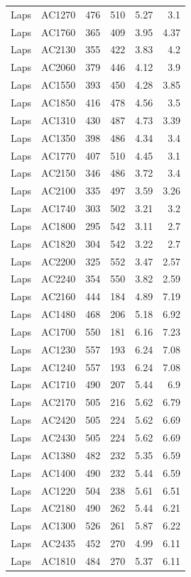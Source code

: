 \documentclass[article,10pt,microtype]{article}
\begin{document}
\begin{longtable}{llrrrr}
Laps & AC1270 & 476 & 510 & 5.27 & 3.1\\
Laps & AC1760 & 365 & 409 & 3.95 & 4.37\\
Laps & AC2130 & 355 & 422 & 3.83 & 4.2\\
Laps & AC2060 & 379 & 446 & 4.12 & 3.9\\
Laps & AC1550 & 393 & 450 & 4.28 & 3.85\\
Laps & AC1850 & 416 & 478 & 4.56 & 3.5\\
Laps & AC1310 & 430 & 487 & 4.73 & 3.39\\
Laps & AC1350 & 398 & 486 & 4.34 & 3.4\\
Laps & AC1770 & 407 & 510 & 4.45 & 3.1\\
Laps & AC2150 & 346 & 486 & 3.72 & 3.4\\
Laps & AC2100 & 335 & 497 & 3.59 & 3.26\\
Laps & AC1740 & 303 & 502 & 3.21 & 3.2\\
Laps & AC1800 & 295 & 542 & 3.11 & 2.7\\
Laps & AC1820 & 304 & 542 & 3.22 & 2.7\\
Laps & AC2200 & 325 & 552 & 3.47 & 2.57\\
Laps & AC2240 & 354 & 550 & 3.82 & 2.59\\
Laps & AC2160 & 444 & 184 & 4.89 & 7.19\\
Laps & AC1480 & 468 & 206 & 5.18 & 6.92\\
Laps & AC1700 & 550 & 181 & 6.16 & 7.23\\
Laps & AC1230 & 557 & 193 & 6.24 & 7.08\\
Laps & AC1240 & 557 & 193 & 6.24 & 7.08\\
Laps & AC1710 & 490 & 207 & 5.44 & 6.9\\
Laps & AC2170 & 505 & 216 & 5.62 & 6.79\\
Laps & AC2420 & 505 & 224 & 5.62 & 6.69\\
Laps & AC2430 & 505 & 224 & 5.62 & 6.69\\
Laps & AC1380 & 482 & 232 & 5.35 & 6.59\\
Laps & AC1400 & 490 & 232 & 5.44 & 6.59\\
Laps & AC1220 & 504 & 238 & 5.61 & 6.51\\
Laps & AC2180 & 490 & 262 & 5.44 & 6.21\\
Laps & AC1300 & 526 & 261 & 5.87 & 6.22\\
Laps & AC2435 & 452 & 270 & 4.99 & 6.11\\
Laps & AC1810 & 484 & 270 & 5.37 & 6.11\\

\end{longtable}
\end{document}
